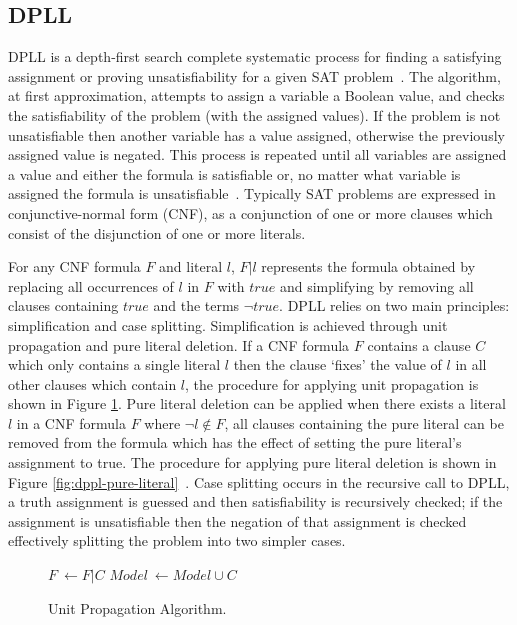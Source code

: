 \documentclass[]{final_report}
\begin{document}
\subsection{DPLL}
DPLL is a depth-first search complete systematic process for finding a satisfying assignment or proving unsatisfiability for a given SAT problem~\cite{Davis:1962:MPT:368273.368557}. The algorithm, at first approximation, attempts to assign a variable a Boolean value, and checks the satisfiability of the problem (with the assigned values). If the problem is not unsatisfiable then another variable has a value assigned, otherwise the previously assigned value is negated. This process is repeated until all variables are assigned a value and either the formula is satisfiable or, no matter what variable is assigned the formula is unsatisfiable~\cite{sattosmt}. Typically SAT problems are expressed in conjunctive-normal form (CNF), as a conjunction of one or more clauses which consist of the disjunction of one or more literals. 

For any CNF formula $F$ and literal $l$, $\mathit{F}|l$ represents the formula obtained by replacing all occurrences of $l$ in $F$ with $true$ and simplifying by removing all clauses containing $true$ and the terms $\lnot{true}$. DPLL relies on two main principles: simplification and case splitting. Simplification is achieved through unit propagation and pure literal deletion. If a CNF formula $\mathit{F}$ contains a clause $C$ which only contains a single literal $l$ then the clause `fixes' the value of $l$ in all other clauses which contain $l$, the procedure for applying unit propagation is shown in Figure \ref{fig:dppl-unit-propagate}. Pure literal deletion can be applied when there exists a literal $l$ in a CNF formula $\mathit{F}$ where $\lnot{l} \notin \mathit{F}$, all clauses containing the pure literal can be removed from the formula which has the effect of setting the pure literal's assignment to true. The procedure for applying pure literal deletion is shown in Figure \ref{fig:dppl-pure-literal}~\cite{dpll-worksheet,dpll-method}. Case splitting occurs in the recursive call to DPLL, a truth assignment is guessed and then satisfiability is recursively checked; if the assignment is unsatisfiable then the negation of that assignment is checked effectively splitting the problem into two simpler cases.

\begin{figure}[t]
\begin{algorithmic}
		\State $\mathit{F}~\gets \mathit{F}|C$
		\State $Model~\gets Model \cup {C}$
	\EndWhile
\EndFunction    
\end{algorithmic}

\caption{\label{fig:dppl-unit-propagate} Unit Propagation Algorithm.}
\end{figure}
\end{document}
